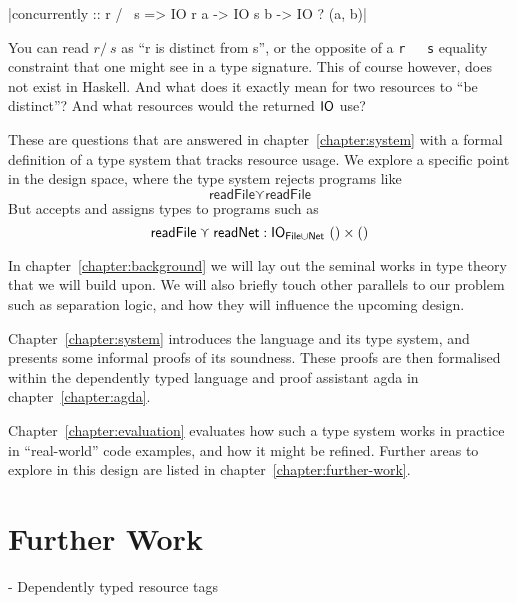 \documentclass{report}
\begin{document}
|concurrently :: r /~ s => IO r a -> IO s b -> IO ? (a, b)|

You can read $r /~ s$ as ``r is distinct from s'', or the opposite of a
\texttt{r ~ s} equality constraint that one might see in a type signature. This
of course however, does not exist in Haskell.  And what does it exactly mean for
two resources to ``be distinct''? And what resources would the returned $\mathsf{IO}$
use?

These are questions that are answered in chapter~\ref{chapter:system} with a
formal definition of a type system that tracks resource usage. We explore a
specific point in the design space, where the type system rejects programs like
$$
\textsf{readFile} \curlyvee \textsf{readFile}
$$
But accepts and assigns types to programs such as
$$
\textsf{readFile} \curlyvee \textsf{readNet} : \mathsf{IO}_{\textsf{File} \cup \textsf{Net}} \ () \times ()
$$

In chapter~\ref{chapter:background} we will lay out the seminal works in type
theory that we will build upon. We will also briefly touch other parallels to
our problem such as separation logic, and how they will influence the upcoming
design.

Chapter~\ref{chapter:system} introduces the language and its type system, and
presents some informal proofs of its soundness. These proofs are then
formalised within the dependently typed language and proof assistant agda in
chapter~\ref{chapter:agda}.

Chapter~\ref{chapter:evaluation} evaluates how such a type system works in
practice in ``real-world'' code examples, and how it might be refined. Further
areas to explore in this design are listed in chapter~\ref{chapter:further-work}.









\chapter{Further Work} \label{chapter:futher-work}

- Dependently typed resource tags





\end{document}
